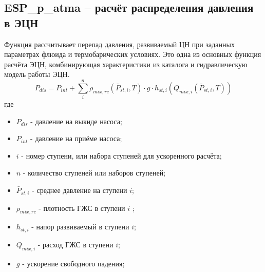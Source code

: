 \subsection{ESP\_p\_atma – расчёт распределения давления в ЭЦН}
Функция рассчитывает перепад давления, развиваемый ЦН при заданных параметрах флюида и термобарических условиях. Это одна из основных функция расчёта ЭЦН, комбинирующая характеристики из каталога и гидравлическую модель работы ЭЦН.
$$ P_{dis} = P_{int} + \sum_i^n{\rho_{mix,rc}(\bar{P}_{st,i},T) \cdot g \cdot h_{st,i}(Q_{mix,i}(\bar{P}_{st,i},T))} $$
где 
\begin{itemize}
	\item $P_{dis}$ - давление на выкиде насоса;
	\item $P_{int}$ - давление на приёме насоса;
	\item $i$ - номер ступени, или набора ступеней для ускоренного расчёта;
	\item $n$ - количество ступеней или наборов ступеней;
	\item $\bar{P}_{st,i}$ - среднее давление на  ступени $i$;
	\item $\rho_{mix,rc}$ - плотность ГЖС  в ступени $i$ ;
	\item $h_{st,i}$ - напор развиваемый  в ступени $i$;
	\item $Q_{mix,i}$ - расход ГЖС в ступени $i$;
	\item $g$ - ускорение свободного падения;
	
\end{itemize}


